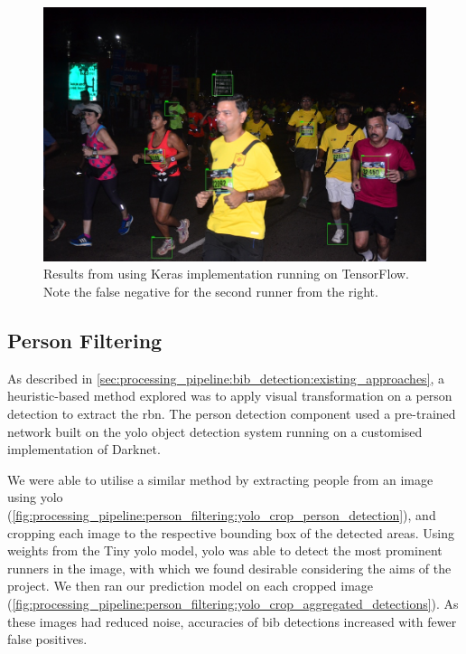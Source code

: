 \begin{figure}[h]
  \includegraphics[width=\textwidth]{images/processing/bib_only}
  \caption[Bib detection results using FRCNN]{Results from using \frcnn{} Keras implementation running on TensorFlow. Note the false negative for the second runner from the right.}
  \label{fig:processing_pipeline:bib_only}
\end{figure}


\subsection{Person Filtering}
\label{sec:processing_pipeline:person_filtering}

As described in \cref{sec:processing_pipeline:bib_detection:existing_approaches}, a heuristic-based method explored was to apply visual transformation on a person detection to extract the \gls{rbn}. The person detection component used a pre-trained network built on the \gls{yolo} object detection system running on a customised implementation of Darknet.

We were able to utilise a similar method by extracting people from an image using \gls{yolo} (\cref{fig:processing_pipeline:person_filtering:yolo_crop_person_detection}), and cropping each image to the respective bounding box of the detected areas. Using weights from the Tiny \gls{yolo} model, \gls{yolo} was able to detect the most prominent runners in the image, with which we found desirable considering the aims of the project. We then ran our \frcnn{} prediction model on each cropped image (\cref{fig:processing_pipeline:person_filtering:yolo_crop_aggregated_detections}). As these images had reduced noise, accuracies of bib detections increased with fewer false positives. 

